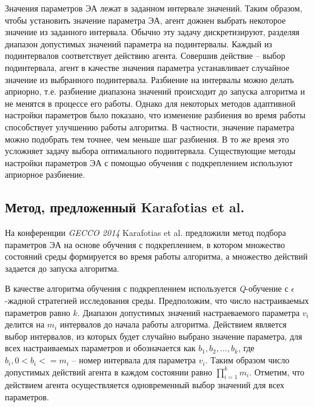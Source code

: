 
Значения параметров ЭА лежат в заданном интервале значений. Таким образом, чтобы установить значение параметра ЭА, агент дожнен выбрать некоторое значение из заданного интервала. Обычно эту задачу дискретизируют, разделяя диапазон допустимых значений параметра на подинтервалы. Каждый из подинтервалов соответствует действию агента. Совершив действие -- выбор подинтервала, агент в качестве значения параметра устанавливает случайное значение из выбранного подинтервала. Разбиение на интервалы можно делать априорно, т.е. разбиение диапазона значений происходит до запуска алгоритма и не менятся в процессе его работы. Однако для некоторых методов адаптивной настройки параметров было показано, что изменение разбиения во время работы способствует улучшению работы алгоритма. В частности, значение параметра можно подобрать тем точнее, чем меньше шаг разбиения. В то же время это усложняет задачу выбора оптимального подинтервала. Существующие методы настройки параметров ЭА с помощью обучения с подкреплением используют априорное разбиение.

\subsection{Метод, предложенный Karafotias et al.}
\label{karafotias}

На конференции \textit{GECCO 2014} Karafotias et al. предложили метод подбора параметров ЭА на основе обучения с подкреплением, в котором множество состояний среды формируется во время работы алгоритма, а множество действий задается до запуска алгоритма.

В качестве алгоритма обучения с подкреплением используется \textit{Q}-обучение с $\epsilon$-жадной стратегией исследования среды.
Предположим, что число настраиваемых параметров равно $k$. Диапазон допустимых значений настраеваемого параметра $v_i$ делится на $m_i$ интервалов до начала работы алгоритма. Действием является выбор интервалов, из которых будет случайно выбрано значение параметра, для всех настраиваемых параметров и обозначается как $b_1, b_2, \ldots, b_k$, где $b_i, 0 < b_i <= m_i$ -- номер интервала для параметра $v_i$. Таким образом число допустимых действий агента в каждом состоянии равно $\prod\limits_{i = 1}^k{m_i}$. Отметим, что действием агента осуществляется одновременный выбор значений для всех параметров. 


